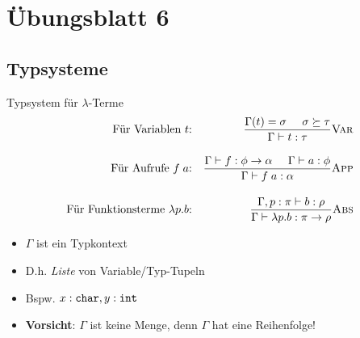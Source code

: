 \documentclass{beamer}
\begin{document}
\section{Übungsblatt 6}

\subsection{Typsysteme}

\begin{frame}{Typsystem für $\lambda$-Terme}
	\begin{align*}
		\textrm{Für Variablen $t$:} && \frac{\Gamma{}(t) = \sigma \;\;\;\;\; \sigma \succeq \tau}{\Gamma \vdash t : \tau} \textrm{\textsc{Var}} \\[1em]
		\textrm{Für Aufrufe $f\;{}a$:} && \frac{\Gamma \vdash f : \phi \to \alpha \;\;\;\;\; \Gamma \vdash a : \phi}{\Gamma \vdash f\;{}a : \alpha} \textrm{\textsc{App}} \\[1em]
		\textrm{Für Funktionsterme $\lambda{}p.b$:} && \frac{\Gamma, p : \pi \vdash b : \rho}{\Gamma \vdash \lambda{}p.b : \pi \to \rho} \textrm{\textsc{Abs}}
	\end{align*}

	\begin{itemize}
		\item $\Gamma$ ist ein Typkontext
		\item D.h. \emph{Liste} von Variable/Typ-Tupeln
		\item Bspw. $x : \textrm{\texttt{char}}, y : \textrm{\texttt{int}}$
		\item \textbf{Vorsicht}: $\Gamma$ ist keine Menge, denn $\Gamma$ hat eine Reihenfolge!
	\end{itemize}
\end{frame}
\end{document}
